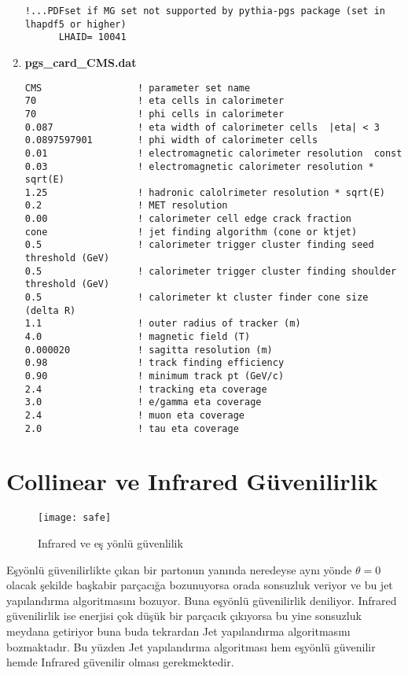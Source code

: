 \begin{enumerate}
\begin{lstlisting}
!...PDFset if MG set not supported by pythia-pgs package (set in lhapdf5 or higher)
      LHAID= 10041

\end{lstlisting}
\item \textbf{pgs\_card\_CMS.dat}
\begin{lstlisting}
CMS                 ! parameter set name
70                  ! eta cells in calorimeter  
70                  ! phi cells in calorimeter
0.087               ! eta width of calorimeter cells  |eta| < 3
0.0897597901        ! phi width of calorimeter cells
0.01                ! electromagnetic calorimeter resolution  const
0.03                ! electromagnetic calorimeter resolution * sqrt(E)
1.25                ! hadronic calolrimeter resolution * sqrt(E)
0.2                 ! MET resolution
0.00                ! calorimeter cell edge crack fraction
cone                ! jet finding algorithm (cone or ktjet)
0.5                 ! calorimeter trigger cluster finding seed threshold (GeV)
0.5                 ! calorimeter trigger cluster finding shoulder threshold (GeV)
0.5                 ! calorimeter kt cluster finder cone size (delta R)
1.1                 ! outer radius of tracker (m)
4.0                 ! magnetic field (T)
0.000020            ! sagitta resolution (m)
0.98                ! track finding efficiency
0.90                ! minimum track pt (GeV/c)
2.4                 ! tracking eta coverage
3.0                 ! e/gamma eta coverage
2.4                 ! muon eta coverage
2.0                 ! tau eta coverage
\end{lstlisting}
\end{enumerate}
\section{Collinear ve Infrared Güvenilirlik}

\begin{wrapfigure}{r}{3cm}
\caption{Infrared ve eş yönlü güvenlilik}
\texttt{[image: safe]}
\end{wrapfigure}
Eşyönlü güvenilirlikte çıkan bir partonun yanında neredeyse aynı yönde $\theta = 0$ olacak şekilde başkabir parçacığa bozunuyorsa orada sonsuzluk veriyor ve bu jet yapılandırma algoritmasını bozuyor. Buna eşyönlü güvenilirlik deniliyor. 
Infrared güvenilirlik ise enerjisi çok düşük bir parçacık çıkıyorsa bu yine sonsuzluk meydana getiriyor buna buda tekrardan Jet yapılandırma algoritmasını bozmaktadır. Bu yüzden Jet yapılandırma algoritması hem eşyönlü güvenilir hemde Infrared güvenilir olması gerekmektedir.\\

